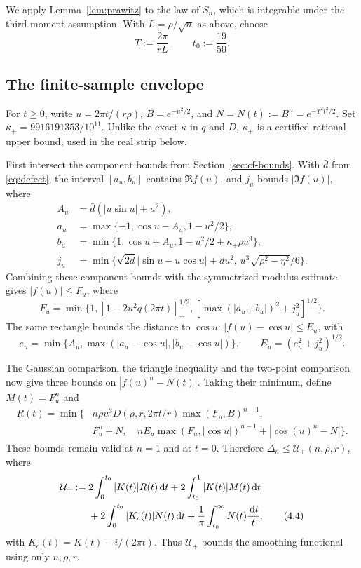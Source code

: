 \documentclass[11pt]{article}
\newcommand{\dd}{\,\mathrm d}
\newcommand{\pos}[1]{[#1]_{+}}
\begin{document}
We apply Lemma~\ref{lem:prawitz} to the law of \(S_n\), which is integrable
under the third-moment assumption.  With
\(L=\rho/\sqrt n\) as above, choose
\[
 T:=\frac{2\pi}{rL},\qquad t_0:=\frac{19}{50}.
 \label{eq:parameters}\tag{4.3}
\]
\subsection{The finite-sample envelope}

For \(t\ge0\), write \(u=2\pi t/(r\rho)\), \(B=e^{-u^2/2}\), and
\(N=N(t):=B^n=e^{-T^2t^2/2}\). Set
\(\kappa_+=9916191353/10^{11}\). Unlike the exact \(\kappa\) in
\(q\) and \(D\), \(\kappa_+\) is a certified rational upper bound,
used in the real strip below.

First intersect the component bounds from Section~\ref{sec:cf-bounds}.
With \(\bar d\) from \eqref{eq:defect}, the interval \([a_u,b_u]\)
contains \(\Re f(u)\), and \(j_u\) bounds \(|\Im f(u)|\), where
\[
\begin{aligned}
 A_u&=\bar d(|u\sin u|+u^2),\\
 a_u&=\max\{-1,\cos u-A_u,1-u^2/2\},\\
 b_u&=\min\{1,\cos u+A_u,1-u^2/2+\kappa_+\rho u^3\},\\
 j_u&=\min\{\sqrt{2\bar d}|\sin u-u\cos u|+\bar d u^2,\,
                    u^3\sqrt{\rho^2-\eta^2}/6\}.
\end{aligned}
\]
Combining these component bounds with the symmetrized modulus estimate gives
\(|f(u)|\le F_u\), where
\[
 F_u=\min\{1,\pos{1-2u^2q(2\pi t)}^{1/2},
                    [\max(|a_u|,|b_u|)^2+j_u^2]^{1/2}\}.
\]
The same rectangle bounds the distance to \(\cos u\):
\(|f(u)-\cos u|\le E_u\), with
\[
 e_u=\min\{A_u,\max(|a_u-\cos u|,|b_u-\cos u|)\},\qquad
 E_u=(e_u^2+j_u^2)^{1/2}.
\]

The Gaussian comparison, the triangle inequality and the two-point
comparison now give three bounds on \(|f(u)^n-N(t)|\). Taking their
minimum, define \(M(t)=F_u^n\) and
\[
\begin{aligned}
 R(t)=\min\bigl\{&
 n\rho u^3D(\rho,r,2\pi t/r)\max(F_u,B)^{n-1},\\
 &F_u^n+N,\quad
 nE_u\max(F_u,|\cos u|)^{n-1}+|\cos(u)^n-N|\bigr\}.
\end{aligned}
\]
These bounds remain valid at \(n=1\) and at \(t=0\).
Therefore \(\Delta_n\le\mathcal U_+(n,\rho,r)\), where
\begin{align}
 \mathcal U_+:={}&
 2\int_0^{t_0}|K(t)|R(t)\dd t
 +2\int_{t_0}^1|K(t)|M(t)\dd t \notag\\
 &+2\int_0^{t_0}|K_c(t)|N(t)\dd t
 +\frac1\pi\int_{t_0}^{\infty}N(t)\frac{\dd t}{t},
 \label{eq:U-def}\tag{4.4}
\end{align}
with \(K_c(t)=K(t)-i/(2\pi t)\). Thus \(\mathcal U_+\) bounds the
smoothing functional using only \(n,\rho,r\).
\end{document}
